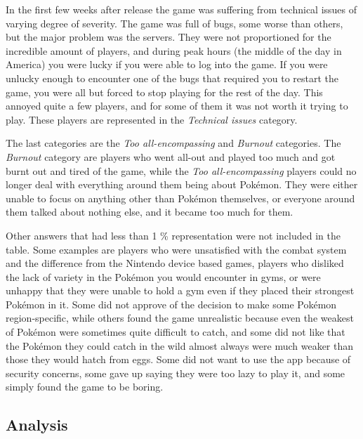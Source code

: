 In the first few weeks after release the game was suffering from technical issues of varying degree of severity. The game was full of bugs, some worse than others, but the major problem was the servers. They were not proportioned for the incredible amount of players, and during peak hours (the middle of the day in America) you were lucky if you were able to log into the game. If you were unlucky enough to encounter one of the bugs that required you to restart the game, you were all but forced to stop playing for the rest of the day. This annoyed quite a few players, and for some of them it was not worth it trying to play. These players are represented in the \emph{Technical issues} category.

The last categories are the \emph{Too all-encompassing} and \emph{Burnout} categories. The \emph{Burnout} category are players who went all-out and played too much and got burnt out and tired of the game, while the \emph{Too all-encompassing} players could no longer deal with everything around them being about Pokémon. They were either unable to focus on anything other than Pokémon themselves, or everyone around them talked about nothing else, and it became too much for them.

Other answers that had less than 1 \% representation were not included in the table. Some examples are players who were unsatisfied with the combat system and the difference from the Nintendo device based games, players who disliked the lack of variety in the Pokémon you would encounter in gyms, or were unhappy that they were unable to hold a gym even if they placed their strongest Pokémon in it. Some did not approve of the decision to make some Pokémon region-specific, while others found the game unrealistic because even the weakest of Pokémon were sometimes quite difficult to catch, and some did not like that the Pokémon they could catch in the wild almost always were much weaker than those they would hatch from eggs. Some did not want to use the app because of security concerns, some gave up saying they were too lazy to play it, and some simply found the game to be boring.

\subsection{Analysis}
\label{sec:success-factors-quitting-analysis}

